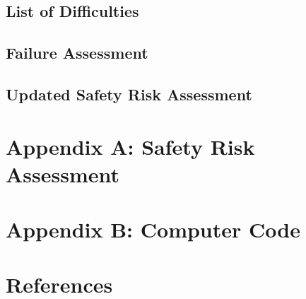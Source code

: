 \documentclass[a4paper,11pt]{article}
\begin{document}
\subsection{List of Difficulties}
\subsection{Failure Assessment}
\subsection{Updated Safety Risk Assessment}
\section{Appendix A: Safety Risk Assessment}
\section{Appendix B: Computer Code}
\section{References}
\end{document}
